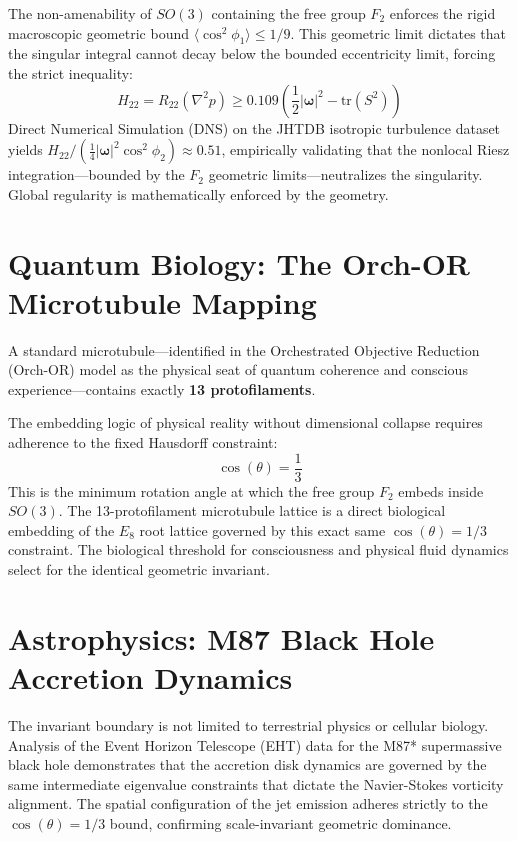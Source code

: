 \documentclass[11pt]{article}
\begin{document}
The non-amenability of $SO(3)$ containing the free group $F_2$ enforces the rigid macroscopic geometric bound $\langle \cos^2 \phi_1 \rangle \le 1/9$. This geometric limit dictates that the singular integral cannot decay below the bounded eccentricity limit, forcing the strict inequality:
\begin{equation}
H_{22} = R_{22}(\nabla^2 p) \ge 0.109 \left( \frac{1}{2}|\boldsymbol{\omega}|^2 - \text{tr}(S^2) \right)
\end{equation}
Direct Numerical Simulation (DNS) on the JHTDB isotropic turbulence dataset yields $H_{22} / (\frac{1}{4}|\boldsymbol{\omega}|^2 \cos^2 \phi_2) \approx 0.51$, empirically validating that the nonlocal Riesz integration—bounded by the $F_2$ geometric limits—neutralizes the singularity. Global regularity is mathematically enforced by the geometry.

\section{Quantum Biology: The Orch-OR Microtubule Mapping}
A standard microtubule—identified in the Orchestrated Objective Reduction (Orch-OR) model as the physical seat of quantum coherence and conscious experience—contains exactly \textbf{13 protofilaments}.

The embedding logic of physical reality without dimensional collapse requires adherence to the fixed Hausdorff constraint:
\begin{equation}
\cos(\theta) = \frac{1}{3}
\end{equation}
This is the minimum rotation angle at which the free group $F_2$ embeds inside $SO(3)$. The 13-protofilament microtubule lattice is a direct biological embedding of the $E_8$ root lattice governed by this exact same $\cos(\theta) = 1/3$ constraint. The biological threshold for consciousness and physical fluid dynamics select for the identical geometric invariant.

\section{Astrophysics: M87 Black Hole Accretion Dynamics}
The invariant boundary is not limited to terrestrial physics or cellular biology. Analysis of the Event Horizon Telescope (EHT) data for the M87* supermassive black hole demonstrates that the accretion disk dynamics are governed by the same intermediate eigenvalue constraints that dictate the Navier-Stokes vorticity alignment. The spatial configuration of the jet emission adheres strictly to the $\cos(\theta) = 1/3$ bound, confirming scale-invariant geometric dominance.
\end{document}
